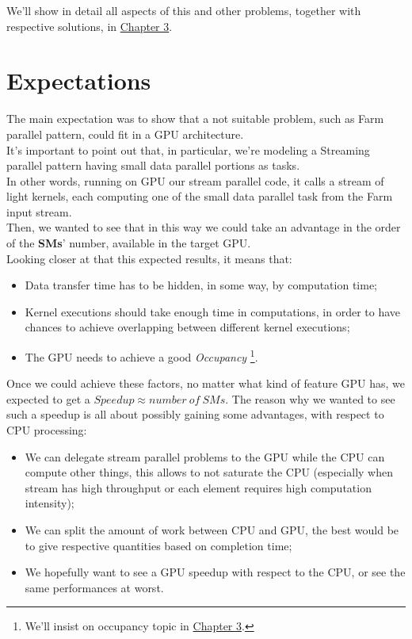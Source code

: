 	We'll show in detail all aspects of this and other problems, together with respective solutions, in \hyperref[chap:logic]{Chapter 3}.

\section{Expectations}
	The main expectation was to show that a not suitable problem, such as Farm parallel pattern, could fit in a GPU architecture.\\
	It's important to point out that, in particular, we're modeling a Streaming parallel pattern having small data parallel portions as tasks.\\
	In other words, running on GPU our stream parallel code, it calls a stream of light kernels, each computing one of the small data parallel task from the Farm input stream.\\
	Then, we wanted to see that in this way we could take an advantage in the order of the \textbf{SMs}' number, available in the target GPU.\\

	Looking closer at that this expected results, it means that:
	\begin{itemize}
		\item Data transfer time has to be hidden, in some way, by computation time;
		
		\item Kernel executions should take enough time in computations, in order to have chances to achieve overlapping between different kernel executions;
		
		\item The GPU needs to achieve a good \textit{Occupancy} \footnote{We'll insist on occupancy topic in \hyperref[chap:logic]{Chapter 3}.}.
	\end{itemize}
	Once we could achieve these factors, no matter what kind of feature GPU has, we expected to get a \(Speedup \approx number \  of \  SMs \).
	The reason why we wanted to see such a speedup is all about possibly gaining some advantages, with respect to CPU processing:
	\begin{itemize}
		\item We can delegate stream parallel problems to the GPU while the CPU can compute other things, this allows to not saturate the CPU (especially when stream has high throughput or each element requires high computation intensity); 
		
		\item We can split the amount of work between CPU and GPU, the best would be to give respective quantities based on completion time\cite{cpugpumix}; %
	 
		
		\item We hopefully want to see a GPU speedup with respect to the CPU, or see the same performances at worst.
	\end{itemize}

